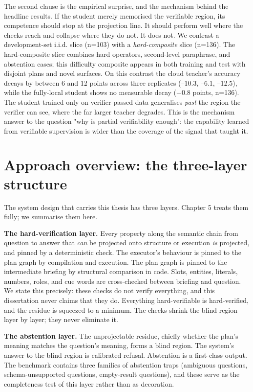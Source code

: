 The second clause is the empirical surprise, and the mechanism behind the headline results. If the student merely memorised the verifiable region, its competence should stop at the projection line. It should perform well where the checks reach and collapse where they do not. It does not. We contrast a development-set i.i.d. slice (n=103) with a \emph{hard-composite} slice (n=136). The hard-composite slice combines hard operators, second-level paraphrase, and abstention cases; this difficulty composite appears in both training and test with disjoint plans and novel surfaces. On this contrast the cloud teacher's accuracy decays by between 6 and 12 points across three replicates (--10.3, --6.1, --12.5), while the fully-local student shows no measurable decay (+0.8 points, n=136). The student trained only on verifier-passed data generalises \emph{past} the region the verifier can see, where the far larger teacher degrades. This is the mechanism answer to the question "why is partial verifiability enough": the capability learned from verifiable supervision is wider than the coverage of the signal that taught it.

\section{Approach overview: the three-layer structure}\label{sec:approach-overview-the-three-layer-struct}

The system design that carries this thesis has three layers. Chapter 5 treats them fully; we summarise them here.

\textbf{The hard-verification layer.} Every property along the semantic chain from question to answer that \emph{can} be projected onto structure or execution \emph{is} projected, and pinned by a deterministic check. The executor's behaviour is pinned to the plan graph by compilation and execution. The plan graph is pinned to the intermediate briefing by structural comparison in code. Slots, entities, literals, numbers, roles, and cue words are cross-checked between briefing and question. We state this precisely: these checks do not verify everything, and this dissertation never claims that they do. Everything hard-verifiable is hard-verified, and the residue is squeezed to a minimum. The checks shrink the blind region layer by layer; they never eliminate it.

\textbf{The abstention layer.} The unprojectable residue, chiefly whether the plan's meaning matches the question's meaning, forms a blind region. The system's answer to the blind region is calibrated refusal. Abstention is a first-class output. The benchmark contains three families of abstention traps (ambiguous questions, schema-unsupported questions, empty-result questions), and these serve as the completeness test of this layer rather than as decoration.

